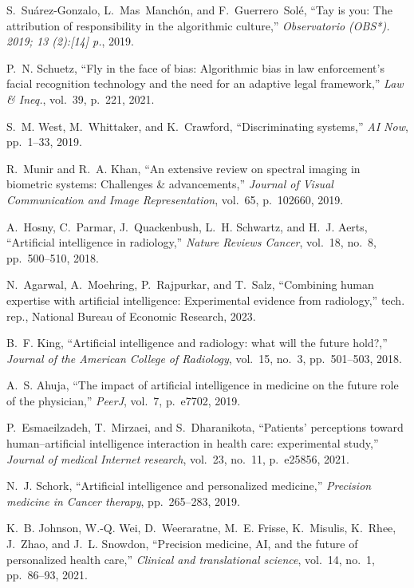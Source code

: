 \documentclass{article}
\begin{document}
\begin{thebibliography}{100}
	S.~Su{\'a}rez-Gonzalo, L.~Mas~Manch{\'o}n, and F.~Guerrero~Sol{\'e}, ``Tay is
	you: The attribution of responsibility in the algorithmic culture,'' {\em
		Observatorio (OBS*). 2019; 13 (2):[14] p.}, 2019.
	
	P.~N. Schuetz, ``Fly in the face of bias: Algorithmic bias in law enforcement's
	facial recognition technology and the need for an adaptive legal framework,''
	{\em Law \& Ineq.}, vol.~39, p.~221, 2021.
	
	S.~M. West, M.~Whittaker, and K.~Crawford, ``Discriminating systems,'' {\em
		{AI} Now}, pp.~1--33, 2019.
	
	R.~Munir and R.~A. Khan, ``An extensive review on spectral imaging in biometric
	systems: Challenges \& advancements,'' {\em Journal of Visual Communication
		and Image Representation}, vol.~65, p.~102660, 2019.
	
	A.~Hosny, C.~Parmar, J.~Quackenbush, L.~H. Schwartz, and H.~J. Aerts,
	``Artificial intelligence in radiology,'' {\em Nature Reviews Cancer},
	vol.~18, no.~8, pp.~500--510, 2018.
	
	N.~Agarwal, A.~Moehring, P.~Rajpurkar, and T.~Salz, ``Combining human expertise
	with artificial intelligence: Experimental evidence from radiology,'' tech.
	rep., National Bureau of Economic Research, 2023.
	
	B.~F. King, ``Artificial intelligence and radiology: what will the future
	hold?,'' {\em Journal of the American College of Radiology}, vol.~15, no.~3,
	pp.~501--503, 2018.
	
	A.~S. Ahuja, ``The impact of artificial intelligence in medicine on the future
	role of the physician,'' {\em PeerJ}, vol.~7, p.~e7702, 2019.
	
	P.~Esmaeilzadeh, T.~Mirzaei, and S.~Dharanikota, ``Patients’ perceptions
	toward human--artificial intelligence interaction in health care:
	experimental study,'' {\em Journal of medical Internet research}, vol.~23,
	no.~11, p.~e25856, 2021.
	
	N.~J. Schork, ``Artificial intelligence and personalized medicine,'' {\em
		Precision medicine in Cancer therapy}, pp.~265--283, 2019.
	
	K.~B. Johnson, W.-Q. Wei, D.~Weeraratne, M.~E. Frisse, K.~Misulis, K.~Rhee,
	J.~Zhao, and J.~L. Snowdon, ``Precision medicine, {AI}, and the future of
	personalized health care,'' {\em Clinical and translational science},
	vol.~14, no.~1, pp.~86--93, 2021.
	

\end{thebibliography}
\end{document}
